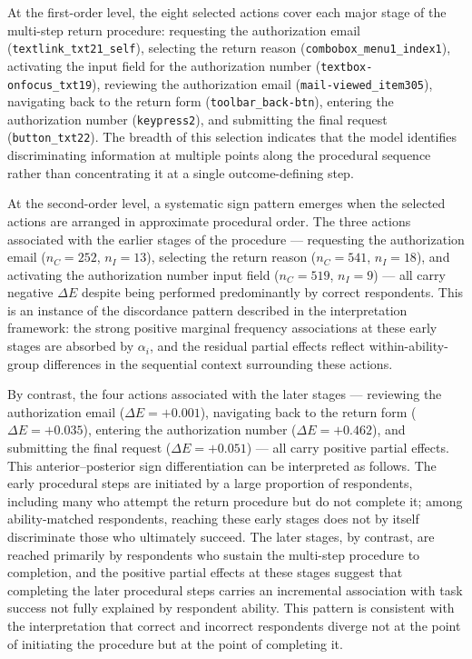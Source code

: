 At the first-order level, the eight selected actions cover each major stage of the multi-step return procedure: requesting the authorization email (\texttt{textlink\_txt21\_self}), selecting the return reason (\texttt{combobox\_menu1\_index1}), activating the input field for the authorization number (\texttt{textbox-onfocus\_txt19}), reviewing the authorization email (\texttt{mail-viewed\_item305}), navigating back to the return form (\texttt{toolbar\_back-btn}), entering the authorization number (\texttt{keypress2}), and submitting the final request (\texttt{button\_txt22}). The breadth of this selection indicates that the model identifies discriminating information at multiple points along the procedural sequence rather than concentrating it at a single outcome-defining step.

At the second-order level, a systematic sign pattern emerges when the selected actions are arranged in approximate procedural order. The three actions associated with the earlier stages of the procedure --- requesting the authorization email ($n_C = 252$, $n_I = 13$), selecting the return reason ($n_C = 541$, $n_I = 18$), and activating the authorization number input field ($n_C = 519$, $n_I = 9$) --- all carry negative $\Delta E$ despite being performed predominantly by correct respondents. This is an instance of the discordance pattern described in the interpretation framework: the strong positive marginal frequency associations at these early stages are absorbed by $\alpha_i$, and the residual partial effects reflect within-ability-group differences in the sequential context surrounding these actions.

By contrast, the four actions associated with the later stages --- reviewing the authorization email ($\Delta E = +0.001$), navigating back to the return form ($\Delta E = +0.035$), entering the authorization number ($\Delta E = +0.462$), and submitting the final request ($\Delta E = +0.051$) --- all carry positive partial effects. This anterior--posterior sign differentiation can be interpreted as follows. The early procedural steps are initiated by a large proportion of respondents, including many who attempt the return procedure but do not complete it; among ability-matched respondents, reaching these early stages does not by itself discriminate those who ultimately succeed. The later stages, by contrast, are reached primarily by respondents who sustain the multi-step procedure to completion, and the positive partial effects at these stages suggest that completing the later procedural steps carries an incremental association with task success not fully explained by respondent ability. This pattern is consistent with the interpretation that correct and incorrect respondents diverge not at the point of initiating the procedure but at the point of completing it.

